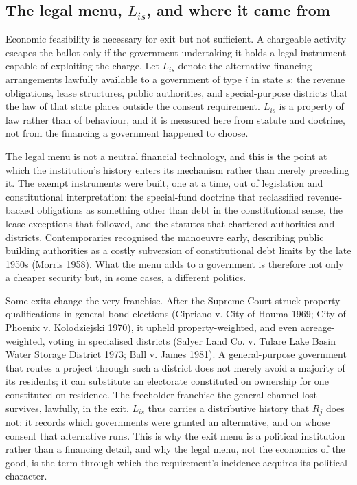 \subsection{The legal menu, $L_{is}$, and where it came from}

Economic feasibility is necessary for exit but not sufficient. A chargeable
activity escapes the ballot only if the government undertaking it holds a legal
instrument capable of exploiting the charge. Let $L_{is}$ denote the
alternative financing arrangements lawfully available to a government of type
$i$ in state $s$: the revenue obligations, lease structures, public
authorities, and special-purpose districts that the law of that state places
outside the consent requirement. $L_{is}$ is a property of law rather than of
behaviour, and it is measured here from statute and doctrine, not from the
financing a government happened to choose.

The legal menu is not a neutral financial technology, and this is the point at
which the institution's history enters its mechanism rather than merely
preceding it. The exempt instruments were built, one at a time, out of
legislation and constitutional interpretation: the special-fund doctrine that
reclassified revenue-backed obligations as something other than debt in the
constitutional sense, the lease exceptions that followed, and the statutes that
chartered authorities and districts. Contemporaries recognised the manoeuvre
early, describing public building authorities as a costly subversion of
constitutional debt limits by the late 1950s (Morris 1958). What the menu adds
to a government is therefore not only a cheaper security but, in some cases, a
different politics.

Some exits change the very franchise. After the Supreme Court struck property
qualifications in general bond elections (Cipriano v. City of Houma 1969; City
of Phoenix v. Kolodziejski 1970), it upheld property-weighted, and even
acreage-weighted, voting in specialised districts (Salyer Land Co. v. Tulare
Lake Basin Water Storage District 1973; Ball v. James 1981). A general-purpose
government that routes a project through such a district does not merely avoid a
majority of its residents; it can substitute an electorate constituted on
ownership for one constituted on residence. The freeholder franchise the
general channel lost survives, lawfully, in the exit. $L_{is}$ thus carries a
distributive history that $R_j$ does not: it records which governments were
granted an alternative, and on whose consent that alternative runs. This is why
the exit menu is a political institution rather than a financing detail, and
why the legal menu, not the economics of the good, is the term through which
the requirement's incidence acquires its political character.

